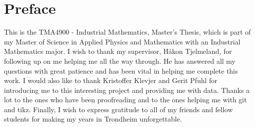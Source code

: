 
\section*{Preface}
This is the TMA4900 - Industrial Mathematics, Master's Thesis, which is part of my Master of Science in Applied Physics and Mathematics with an Industrial Mathematics major. I wish to thank my supervisor, Håkon Tjelmeland, for following up on me helping me all the way through. He has answered all my questions with great patience and has been vital in helping me complete this work.
I would also like to thank Kristoffer Klevjer and Gerit Pfuhl for introducing me to this interesting project and providing me with data. 
Thanks a lot to the ones who have been proofreading and to the ones helping me with git and tikz. 
Finally, I wish to express gratitude to all of my friends and fellow students for making my years in Trondheim unforgettable. 

\cleardoublepage


